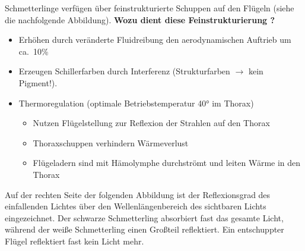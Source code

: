 Schmetterlinge verfügen über feinstrukturierte Schuppen auf den Flügeln (siehe die nachfolgende Abbildung). \textbf{Wozu dient diese Feinstrukturierung \dangersign?}
\begin{itemize}
    \item Erhöhen durch veränderte Fluidreibung den aerodynamischen Auftrieb um ca.\ 10\%
    \item Erzeugen Schillerfarben durch Interferenz (Strukturfarben $\rightarrow$ kein Pigment!). 
    \item Thermoregulation (optimale Betriebstemperatur 40° im Thorax)
    \begin{itemize}
        \item Nutzen Flügelstellung zur Reflexion der Strahlen auf den Thorax
        \item Thoraxschuppen verhindern Wärmeverlust
        \item Flügeladern sind mit Hämolymphe durchströmt und leiten Wärme in den Thorax
    \end{itemize}
\end{itemize}
Auf der rechten Seite der folgenden Abbildung ist der Reflexionsgrad des einfallenden Lichtes über den Wellenlängenbereich des sichtbaren Lichts eingezeichnet. Der schwarze Schmetterling absorbiert fast das gesamte Licht, während der weiße Schmetterling einen Großteil reflektiert. Ein entschuppter Flügel reflektiert fast kein Licht mehr.

